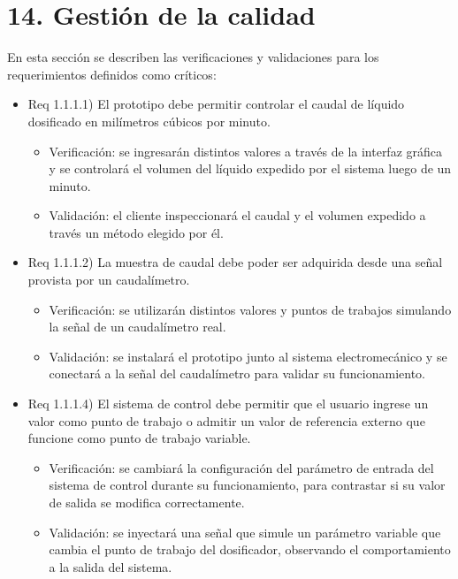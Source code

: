 \documentclass[
11pt, %
]{charter}
\begin{document}
\section{14. Gestión de la calidad}
\label{sec:calidad}

En esta sección se describen las verificaciones y validaciones para los requerimientos definidos como críticos:

\begin{itemize} 
\item Req 1.1.1.1) El prototipo debe permitir controlar el caudal de líquido dosificado en milímetros cúbicos por minuto.

\begin{itemize}
	\item Verificación: se ingresarán distintos valores a través de la interfaz gráfica y se controlará el volumen del líquido expedido por el sistema luego de un minuto.
	\item Validación: el cliente inspeccionará el caudal y el volumen expedido a través un método elegido por él.
\end{itemize}

\item Req 1.1.1.2) La muestra de caudal debe poder ser adquirida desde una señal provista por un caudalímetro.

\begin{itemize}
	\item Verificación: se utilizarán distintos valores y puntos de trabajos simulando la señal de un caudalímetro real.
	\item Validación: se instalará el prototipo junto al sistema electromecánico y se conectará a la señal del caudalímetro para validar su funcionamiento.
\end{itemize}

\item Req 1.1.1.4) El sistema de control debe permitir que el usuario ingrese un valor como punto de trabajo o admitir un valor de referencia externo que funcione como punto de trabajo variable.

\begin{itemize}
	\item Verificación: se cambiará la configuración del parámetro de entrada del sistema de control durante su funcionamiento, para contrastar si su valor de salida se modifica correctamente.
	\item Validación: se inyectará una señal que simule un parámetro variable que cambia el punto de trabajo del dosificador, observando el comportamiento a la salida del sistema.
\end{itemize}


\end{itemize}
\end{document}
